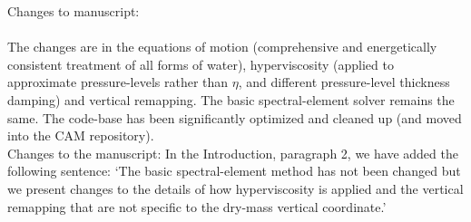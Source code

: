 \documentclass[11pt]{article}
\begin{document}
Changes to manuscript: {\color{blue}{none at this point}}\\

{\color{blue}{
Other than the moist-mass effects, have there been any fundamental improvements to the discretization in CAM-SE? Some of the changes demonstrated in the paper are just re-configuration of runtime parameters. Figure 6 shows a major change in the kinetic energy spectrum, but this should be simply due to the new choice of parameters, and doesn't seem to be due to fundamental improvements in the solver. }}\\

The changes are in the equations of motion (comprehensive and energetically consistent treatment of all forms of water), hyperviscosity (applied to approximate pressure-levels rather than $\eta$, and different pressure-level thickness damping) and vertical remapping. The basic spectral-element solver remains the same. The code-base has been significantly optimized and cleaned up (and moved into the CAM repository).\\

Changes to the manuscript: In the Introduction, paragraph 2, we have added the following sentence: `The basic spectral-element method has not been changed but we present changes to the details of how hyperviscosity is applied and the vertical remapping that are not specific to the dry-mass vertical coordinate.' 
\end{document}
